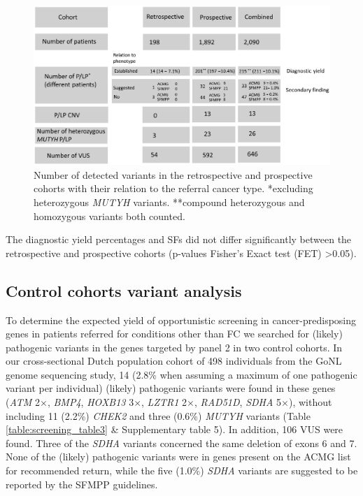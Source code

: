 \begin{figure}
	\includegraphics[width=1.0\linewidth]{img/opportunistic_screening_Fig1}
	\caption[Number of detected variants]{Number of detected variants in the retrospective and prospective cohorts with their relation to the referral cancer type. \footnotesize{*excluding heterozygous \textsl{MUTYH} variants. **compound heterozygous and homozygous variants both counted.}
	}
	\label{fig:screening_Fig1}
\end{figure}


The diagnostic yield percentages and SFs did not differ significantly between the retrospective and prospective cohorts (p-values Fisher’s Exact test (FET) \textgreater0.05).

\subsection{Control cohorts variant analysis}
To determine the expected yield of opportunistic screening in cancer-predisposing genes in patients referred for conditions other than FC we searched for (likely) pathogenic variants in the genes targeted by panel 2 in two control cohorts. 
In our cross-sectional Dutch population cohort of 498 individuals from the GoNL genome sequencing study, 14 (2.8\% when assuming a maximum of one pathogenic variant per individual) (likely) pathogenic variants were found in these genes (\textsl{ATM} 2$\times$, \textsl{BMP4}, \textsl{HOXB13} 3$\times$, \textsl{LZTR1} 2$\times$, \textsl{RAD51D}, \textsl{SDHA} 5$\times$), without including 11 (2.2\%) \textsl{CHEK2} and three (0.6\%) \textsl{MUTYH} variants (Table \ref{table:screening_table3} \& Supplementary table 5). %
In addition, 106 VUS were found. Three of the \textsl{SDHA} variants concerned the same deletion of exons 6 and 7. 
None of the (likely) pathogenic variants were in genes present on the ACMG list for recommended return, while the five (1.0\%) \textsl{SDHA} variants are suggested to be reported by the SFMPP guidelines.

